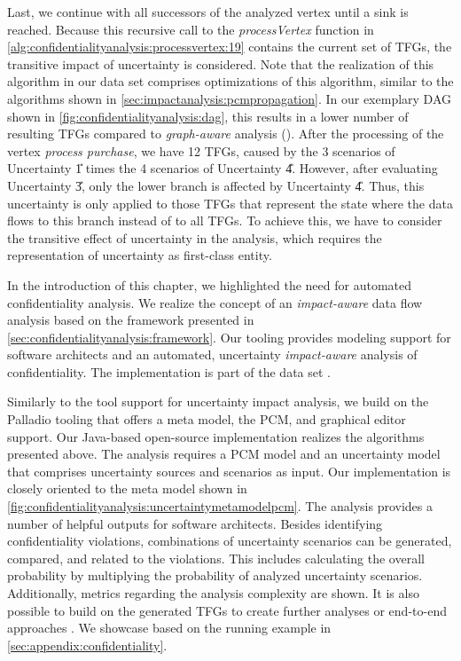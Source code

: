 Last, we continue with all successors of the analyzed vertex until a sink is reached.
Because this recursive call to the \emph{processVertex} function in \autoref{alg:confidentialityanalysis:processvertex:19} contains the current set of \acp{TFG}, the transitive impact of uncertainty is considered.
Note that the realization of this algorithm in our data set \cite{dataset} comprises optimizations of this algorithm, similar to the algorithms shown in \autoref{sec:impactanalysis:pcmpropagation}.
In our exemplary \ac{DAG} shown in \autoref{fig:confidentialityanalysis:dag}, this results in a lower number of resulting \acp{TFG} compared to \emph{graph-aware} analysis ().
After the processing of the vertex \emph{process purchase}, we have 12 \acp{TFG}, caused by the 3 scenarios of Uncertainty \U{1} times the 4 scenarios of Uncertainty \U{4}.
However, after evaluating Uncertainty \U{3}, only the lower branch is affected by Uncertainty \U{4}.
Thus, this uncertainty is only applied to those \acp{TFG} that represent the state where the data flows to this branch instead of to all \acp{TFG}.
To achieve this, we have to consider the transitive effect of uncertainty in the analysis, which requires the representation of uncertainty as first-class entity.


In the introduction of this chapter, we highlighted the need for automated confidentiality analysis.
We realize the concept of an \emph{impact-aware} data flow analysis based on the framework presented in \autoref{sec:confidentialityanalysis:framework}.
Our tooling \abunai provides modeling support for software architects and an automated, uncertainty \emph{impact-aware} analysis of confidentiality.
The implementation is part of the data set \cite{dataset}.

Similarly to the tool support for uncertainty impact analysis, we build on the Palladio tooling \cite{reussner_modeling_2016,reussner_palladio_2024} that offers a meta model, the \ac{PCM}, and graphical editor support.
Our Java-based open-source implementation realizes the algorithms presented above.
The analysis requires a \ac{PCM} model and an uncertainty model that comprises uncertainty sources and scenarios as input.
Our implementation is closely oriented to the meta model shown in \autoref{fig:confidentialityanalysis:uncertaintymetamodelpcm}.
The analysis provides a number of helpful outputs for software architects.
Besides identifying confidentiality violations, combinations of uncertainty scenarios can be generated, compared, and related to the violations.
This includes calculating the overall probability by multiplying the probability of analyzed uncertainty scenarios.
Additionally, metrics regarding the analysis complexity are shown.
It is also possible to build on the generated \acp{TFG} to create further analyses or end-to-end approaches \cite{weyns_towards_2023}.
We showcase \abunai based on the running example in \autoref{sec:appendix:confidentiality}.

